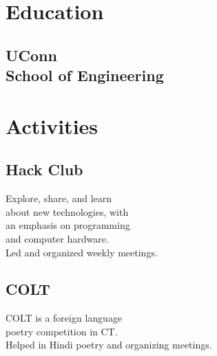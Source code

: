 \documentclass[]{resume-template}
\begin{document}
%
%
\lastupdated{}

%
%

%
%

\begin{minipage}[t]{0.33\textwidth} 


\section{Education}


\subsection{UConn\\ School of Engineering}
\sectionsep{}




\section{Activities}\label{sec:activities}

\subsection{Hack Club}
Explore, share, and learn\\ about
new technologies, with \\
an emphasis on programming\\
and computer hardware.\\ Led and organized weekly meetings.
\vspace{\topsep}
\subsection{COLT}
COLT is a foreign language\\ poetry competition in CT.\\ Helped in Hindi poetry and organizing meetings.
\sectionsep{}


\end{minipage}
\end{document}
